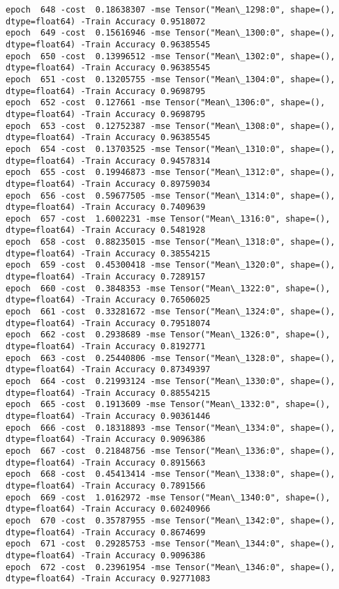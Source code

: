 \documentclass[11pt]{article}
\begin{document}
\begin{Verbatim}[commandchars=\\\{\}]
epoch  648 -cost  0.18638307 -mse Tensor("Mean\_1298:0", shape=(), dtype=float64) -Train Accuracy 0.9518072
epoch  649 -cost  0.15616946 -mse Tensor("Mean\_1300:0", shape=(), dtype=float64) -Train Accuracy 0.96385545
epoch  650 -cost  0.13996512 -mse Tensor("Mean\_1302:0", shape=(), dtype=float64) -Train Accuracy 0.96385545
epoch  651 -cost  0.13205755 -mse Tensor("Mean\_1304:0", shape=(), dtype=float64) -Train Accuracy 0.9698795
epoch  652 -cost  0.127661 -mse Tensor("Mean\_1306:0", shape=(), dtype=float64) -Train Accuracy 0.9698795
epoch  653 -cost  0.12752387 -mse Tensor("Mean\_1308:0", shape=(), dtype=float64) -Train Accuracy 0.96385545
epoch  654 -cost  0.13703525 -mse Tensor("Mean\_1310:0", shape=(), dtype=float64) -Train Accuracy 0.94578314
epoch  655 -cost  0.19946873 -mse Tensor("Mean\_1312:0", shape=(), dtype=float64) -Train Accuracy 0.89759034
epoch  656 -cost  0.59677505 -mse Tensor("Mean\_1314:0", shape=(), dtype=float64) -Train Accuracy 0.7409639
epoch  657 -cost  1.6002231 -mse Tensor("Mean\_1316:0", shape=(), dtype=float64) -Train Accuracy 0.5481928
epoch  658 -cost  0.88235015 -mse Tensor("Mean\_1318:0", shape=(), dtype=float64) -Train Accuracy 0.38554215
epoch  659 -cost  0.45300418 -mse Tensor("Mean\_1320:0", shape=(), dtype=float64) -Train Accuracy 0.7289157
epoch  660 -cost  0.3848353 -mse Tensor("Mean\_1322:0", shape=(), dtype=float64) -Train Accuracy 0.76506025
epoch  661 -cost  0.33281672 -mse Tensor("Mean\_1324:0", shape=(), dtype=float64) -Train Accuracy 0.79518074
epoch  662 -cost  0.2938689 -mse Tensor("Mean\_1326:0", shape=(), dtype=float64) -Train Accuracy 0.8192771
epoch  663 -cost  0.25440806 -mse Tensor("Mean\_1328:0", shape=(), dtype=float64) -Train Accuracy 0.87349397
epoch  664 -cost  0.21993124 -mse Tensor("Mean\_1330:0", shape=(), dtype=float64) -Train Accuracy 0.88554215
epoch  665 -cost  0.1913609 -mse Tensor("Mean\_1332:0", shape=(), dtype=float64) -Train Accuracy 0.90361446
epoch  666 -cost  0.18318893 -mse Tensor("Mean\_1334:0", shape=(), dtype=float64) -Train Accuracy 0.9096386
epoch  667 -cost  0.21848756 -mse Tensor("Mean\_1336:0", shape=(), dtype=float64) -Train Accuracy 0.8915663
epoch  668 -cost  0.45413414 -mse Tensor("Mean\_1338:0", shape=(), dtype=float64) -Train Accuracy 0.7891566
epoch  669 -cost  1.0162972 -mse Tensor("Mean\_1340:0", shape=(), dtype=float64) -Train Accuracy 0.60240966
epoch  670 -cost  0.35787955 -mse Tensor("Mean\_1342:0", shape=(), dtype=float64) -Train Accuracy 0.8674699
epoch  671 -cost  0.29285753 -mse Tensor("Mean\_1344:0", shape=(), dtype=float64) -Train Accuracy 0.9096386
epoch  672 -cost  0.23961954 -mse Tensor("Mean\_1346:0", shape=(), dtype=float64) -Train Accuracy 0.92771083

\end{Verbatim}
\end{document}
